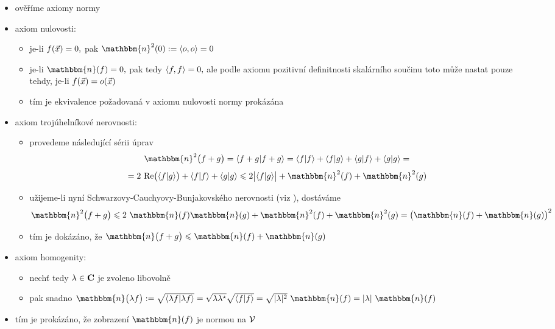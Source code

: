 \begin{itemize}
\item ov\v e\v r\'ime axiomy normy
\item axiom nulovosti:

\begin{itemize}
\item je-li $f({\vec{x}})=0,$ pak $\mathbbm{n}^2(0):=\la o,o\ra=0$
\item je-li $\mathbbm{n}(f)=0,$ pak tedy $\langle f,f \rangle=0,$ ale podle
axiomu pozitivn\'i definitnosti skal\'arn\'iho sou\v cinu toto m\r
u\v ze nastat pouze tehdy, je-li $f({\vec{x}})=o({\vec{x}})$
\item t\'im je ekvivalence po\v zadovan\'a v axiomu nulovosti
normy prok\'az\'ana
\end{itemize}

\item axiom troj\'uheln\'ikov\'e nerovnosti:

\begin{itemize}
\item provedeme n\'asleduj\'ic\'i s\'erii \'uprav
$$\mathbbm{n}^2\bigl(f+g\bigr)=\la f+g|f+g\ra=\la f|f\ra+\la f|g \ra+\la g|f\ra+\la g|g \ra=$$
%
$$=2~\mathrm{Re}\bigl(\la f|g \ra\bigr)+\la f|f \ra+\la g|g \ra \leq 2\bigl|\la f|g \ra\bigr|+\mathbbm{n}^2(f)+\mathbbm{n}^2(g)$$

\item u\v zijeme-li nyn\'i Schwarzovy-Cauchyovy-Bunjakovsk\'eho nerovnosti
(viz \cite{Krbalek_MAB3}), dost\'av\'ame
$$\mathbbm{n}^2\bigl(f+g\bigr) \leq
2~\mathbbm{n}(f)\mathbbm{n}(g)+\mathbbm{n}^2(f)+\mathbbm{n}^2(g)=\bigl(\mathbbm{n}(f)+\mathbbm{n}(g)\bigr)^2$$

\item t\'im je dok\'az\'ano, \v ze $\mathbbm{n}\bigl(f+g\bigr)\leq \mathbbm{n}(f)+\mathbbm{n}(g)$

\end{itemize}


\item axiom homogenity:

\begin{itemize}
\item nech\v t tedy $\lambda\in{\mathbf C}$ je zvoleno libovoln\v e
\item pak snadno $\mathbbm{n}\bigl(\lambda f\bigr):=\sqrt{\la\lambda f|\lambda f\ra}=\sqrt{\lambda\lambda^\star}
\sqrt{\la f|f \ra}=\sqrt{|\lambda|^2}~\mathbbm{n}(f)=|\lambda|~\mathbbm{n}(f)$

\end{itemize}

\item t\'im je prok\'az\'ano, \v ze zobrazen\'i $\mathbbm{n}(f)$ je normou na ${\mathcal V}$

\end{itemize}


